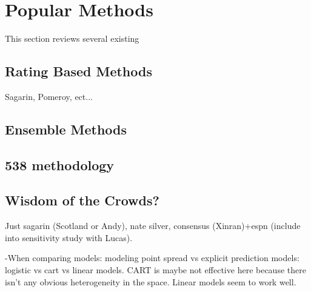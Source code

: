 \section{Popular Methods}  This section reviews several existing
\subsection{Rating Based Methods} Sagarin, Pomeroy, ect...
\subsection{Ensemble Methods}
\subsection{538 methodology}
\subsection{Wisdom of the Crowds?}
Just sagarin (Scotland or Andy), nate silver, consensus (Xinran)+espn (include into sensitivity study with Lucas). 

-When comparing models: modeling point spread vs explicit prediction models: logistic vs cart vs linear models.
CART is maybe not effective here because there isn't any obvious heterogeneity in the space. Linear models seem to work well.